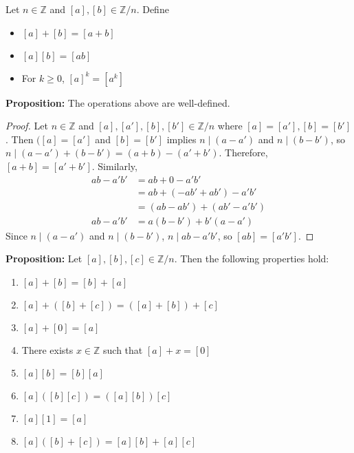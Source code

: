 \documentclass [12pt] {article}
\newcommand{\Z}{\mathbb{Z}}
\newenvironment{definition}[1]{\begin{tcolorbox}[title={Definition: #1},colback=blue!5!white,colframe=black!75!blue]}{\end{tcolorbox}}
\renewcommand{\bf}[1]{\textbf{{#1}}}
\begin{document}
\begin{definition}{Operations on $\Z/n$}
    Let $n \in \Z$ and $[a], [b] \in \Z/n$. Define
    \begin{itemize}[label=$\to$]
        \item $[a] + [b] = [a + b]$
        \item $[a][b] = [ab]$
        \item For $k \geq 0$, $[a]^k = [a^k]$
    \end{itemize}
\end{definition}
\bf{Proposition:} The operations above are well-defined.
\begin{proof}
    Let $n \in \Z$ and $[a], [a'], [b], [b'] \in \Z/n$ where $[a] = [a'], [b] = [b']$. Then
    $([a] = [a']$ and $[b] = [b']$ implies $n \mid (a - a')$ and $n \mid (b - b')$, so 
    $n \mid (a - a') + (b - b') = (a + b) - (a' + b')$. Therefore, $[a + b] = [a' + b']$. Similarly,
    \begin{align*}
        ab - a'b' &= ab + 0 - a'b' \\
                  &= ab + (-ab' + ab') - a'b' \\ 
                  &= (ab - ab') + (ab' - a'b') \\
        ab - a'b' &= a(b - b') + b'(a - a')
    \end{align*}
    Since $n \mid (a - a')$ and $n \mid (b - b')$, $n \mid ab - a'b'$, so $[ab] = [a'b']$.
\end{proof}
\bf{Proposition:} Let $[a], [b], [c] \in \Z/n$. Then the following properties hold:
\begin{enumerate}[label=(\arabic*)]
    \item $[a] + [b] = [b] + [a]$
    \item $[a] + ([b] + [c]) = ([a] + [b]) + [c]$
    \item $[a] + [0] = [a]$
    \item There exists $x \in \Z$ such that $[a] + x = [0]$
    \item $[a][b] = [b][a]$
    \item $[a] ([b][c]) = ([a][b]) [c]$
    \item $[a][1] = [a]$
    \item $[a] ([b] + [c]) = [a][b] + [a][c]$
\end{enumerate}
\newpage
\end{document}
